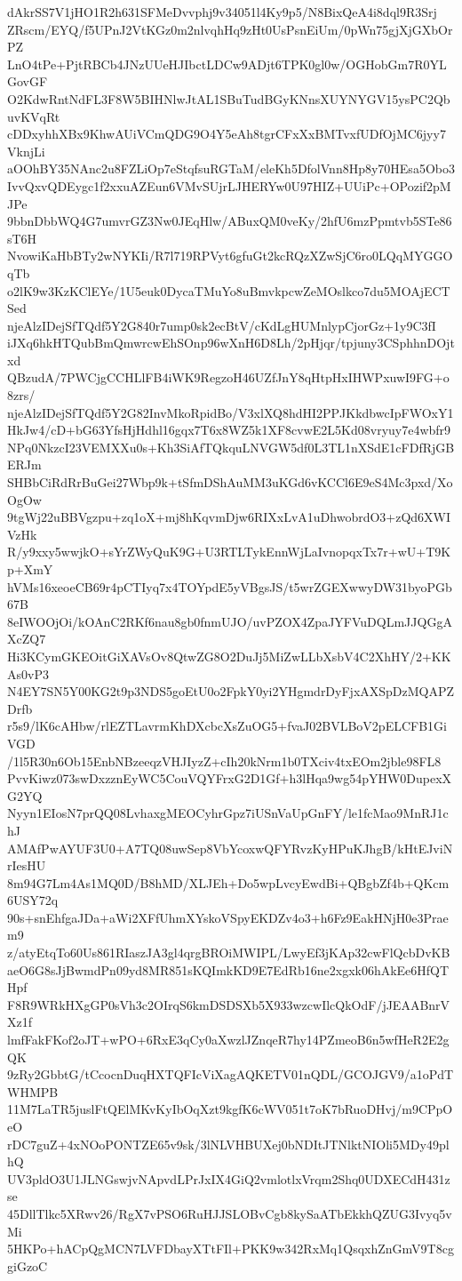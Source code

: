 dAkrSS7V1jHO1R2h631SFMeDvvphj9v34051l4Ky9p5/N8BixQeA4i8dql9R3Srj
ZRscm/EYQ/f5UPnJ2VtKGz0m2nlvqhHq9zHt0UsPsnEiUm/0pWn75gjXjGXbOrPZ
LnO4tPe+PjtRBCb4JNzUUeHJIbctLDCw9ADjt6TPK0gl0w/OGHobGm7R0YLGovGF
O2KdwRntNdFL3F8W5BIHNlwJtAL1SBuTudBGyKNnsXUYNYGV15ysPC2QbuvKVqRt
cDDxyhhXBx9KhwAUiVCmQDG9O4Y5eAh8tgrCFxXxBMTvxfUDfOjMC6jyy7VknjLi
aOOhBY35NAnc2u8FZLiOp7eStqfsuRGTaM/eleKh5DfolVnn8Hp8y70HEsa5Obo3
IvvQxvQDEygc1f2xxuAZEun6VMvSUjrLJHERYw0U97HIZ+UUiPc+OPozif2pMJPe
9bbnDbbWQ4G7umvrGZ3Nw0JEqHlw/ABuxQM0veKy/2hfU6mzPpmtvb5STe86sT6H
NvowiKaHbBTy2wNYKIi/R7l719RPVyt6gfuGt2kcRQzXZwSjC6ro0LQqMYGGOqTb
o2lK9w3KzKClEYe/1U5euk0DycaTMuYo8uBmvkpcwZeMOslkco7du5MOAjECTSed
njeAlzIDejSfTQdf5Y2G840r7ump0sk2ecBtV/cKdLgHUMnlypCjorGz+1y9C3fI
iJXq6hkHTQubBmQmwrcwEhSOnp96wXnH6D8Lh/2pHjqr/tpjuny3CSphhnDOjtxd
QBzudA/7PWCjgCCHLlFB4iWK9RegzoH46UZfJnY8qHtpHxIHWPxuwI9FG+o8zrs/
njeAlzIDejSfTQdf5Y2G82InvMkoRpidBo/V3xlXQ8hdHI2PPJKkdbwcIpFWOxY1
HkJw4/cD+bG63YfsHjHdhl16gqx7T6x8WZ5k1XF8cvwE2L5Kd08vryuy7e4wbfr9
NPq0NkzcI23VEMXXu0s+Kh3SiAfTQkquLNVGW5df0L3TL1nXSdE1cFDfRjGBERJm
SHBbCiRdRrBuGei27Wbp9k+tSfmDShAuMM3uKGd6vKCCl6E9eS4Mc3pxd/XoOgOw
9tgWj22uBBVgzpu+zq1oX+mj8hKqvmDjw6RIXxLvA1uDhwobrdO3+zQd6XWIVzHk
R/y9xxy5wwjkO+sYrZWyQuK9G+U3RTLTykEnnWjLaIvnopqxTx7r+wU+T9Kp+XmY
hVMs16xeoeCB69r4pCTIyq7x4TOYpdE5yVBgsJS/t5wrZGEXwwyDW31byoPGb67B
8eIWOOjOi/kOAnC2RKf6nau8gb0fnmUJO/uvPZOX4ZpaJYFVuDQLmJJQGgAXcZQ7
Hi3KCymGKEOitGiXAVsOv8QtwZG8O2DuJj5MiZwLLbXsbV4C2XhHY/2+KKAs0vP3
N4EY7SN5Y00KG2t9p3NDS5goEtU0o2FpkY0yi2YHgmdrDyFjxAXSpDzMQAPZDrfb
r5s9/lK6cAHbw/rlEZTLavrmKhDXcbcXsZuOG5+fvaJ02BVLBoV2pELCFB1GiVGD
/1l5R30n6Ob15EnbNBzeeqzVHJIyzZ+cIh20kNrm1b0TXciv4txEOm2jble98FL8
PvvKiwz073swDxzznEyWC5CouVQYFrxG2D1Gf+h3lHqa9wg54pYHW0DupexXG2YQ
Nyyn1EIosN7prQQ08LvhaxgMEOCyhrGpz7iUSnVaUpGnFY/le1fcMao9MnRJ1chJ
AMAfPwAYUF3U0+A7TQ08uwSep8VbYcoxwQFYRvzKyHPuKJhgB/kHtEJviNrIesHU
8m94G7Lm4As1MQ0D/B8hMD/XLJEh+Do5wpLvcyEwdBi+QBgbZf4b+QKcm6USY72q
90s+snEhfgaJDa+aWi2XFfUhmXYskoVSpyEKDZv4o3+h6Fz9EakHNjH0e3Praem9
z/atyEtqTo60Us861RIaszJA3gl4qrgBROiMWIPL/LwyEf3jKAp32cwFlQcbDvKB
aeO6G8sJjBwmdPn09yd8MR851sKQImkKD9E7EdRb16ne2xgxk06hAkEe6HfQTHpf
F8R9WRkHXgGP0sVh3c2OIrqS6kmDSDSXb5X933wzcwIlcQkOdF/jJEAABnrVXz1f
lmfFakFKof2oJT+wPO+6RxE3qCy0aXwzlJZnqeR7hy14PZmeoB6n5wfHeR2E2gQK
9zRy2GbbtG/tCcocnDuqHXTQFIcViXagAQKETV01nQDL/GCOJGV9/a1oPdTWHMPB
11M7LaTR5juslFtQElMKvKyIbOqXzt9kgfK6cWV051t7oK7bRuoDHvj/m9CPpOeO
rDC7guZ+4xNOoPONTZE65v9sk/3lNLVHBUXej0bNDItJTNlktNIOli5MDy49plhQ
UV3pldO3U1JLNGswjvNApvdLPrJxIX4GiQ2vmlotlxVrqm2Shq0UDXECdH431zse
45DllTlkc5XRwv26/RgX7vPSO6RuHJJSLOBvCgb8kySaATbEkkhQZUG3Ivyq5vMi
5HKPo+hACpQgMCN7LVFDbayXTtFIl+PKK9w342RxMq1QsqxhZnGmV9T8cggiGzoC
